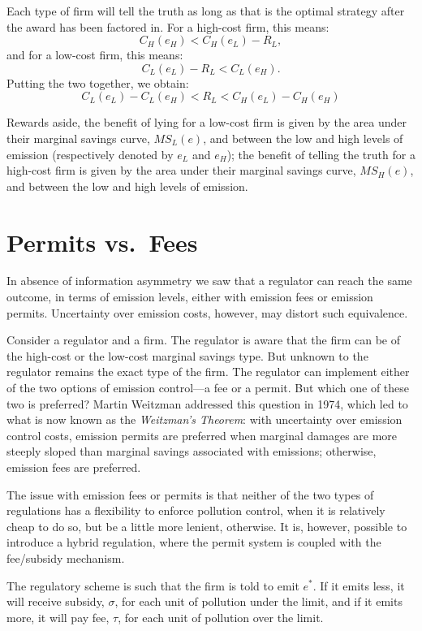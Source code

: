 \documentclass[
]{book}
\begin{document}
Each type of firm will tell the truth as long as that is the optimal strategy after the award has been factored in. For a high-cost firm, this means: \[C_H(e_H) < C_H(e_L)-R_L,\] and for a low-cost firm, this means: \[C_L(e_L)-R_L < C_L(e_H).\] Putting the two together, we obtain: \[C_L(e_L) - C_L(e_H) < R_L < C_H(e_L) - C_H(e_H)\]

Rewards aside, the benefit of lying for a low-cost firm is given by the area under their marginal savings curve, \(MS_L(e)\), and between the low and high levels of emission (respectively denoted by \(e_L\) and \(e_H\)); the benefit of telling the truth for a high-cost firm is given by the area under their marginal savings curve, \(MS_H(e)\), and between the low and high levels of emission.

\hypertarget{permits-vs.-fees}{%
\section{Permits vs.~Fees}\label{permits-vs.-fees}}

In absence of information asymmetry we saw that a regulator can reach the same outcome, in terms of emission levels, either with emission fees or emission permits. Uncertainty over emission costs, however, may distort such equivalence.

Consider a regulator and a firm. The regulator is aware that the firm can be of the high-cost or the low-cost marginal savings type. But unknown to the regulator remains the exact type of the firm. The regulator can implement either of the two options of emission control---a fee or a permit. But which one of these two is preferred? Martin Weitzman addressed this question in 1974, which led to what is now known as the \emph{Weitzman's Theorem}: with uncertainty over emission control costs, emission permits are preferred when marginal damages are more steeply sloped than marginal savings associated with emissions; otherwise, emission fees are preferred.

The issue with emission fees or permits is that neither of the two types of regulations has a flexibility to enforce pollution control, when it is relatively cheap to do so, but be a little more lenient, otherwise. It is, however, possible to introduce a hybrid regulation, where the permit system is coupled with the fee/subsidy mechanism.

The regulatory scheme is such that the firm is told to emit \(e^*\). If it emits less, it will receive subsidy, \(\sigma\), for each unit of pollution under the limit, and if it emits more, it will pay fee, \(\tau\), for each unit of pollution over the limit.
\end{document}
